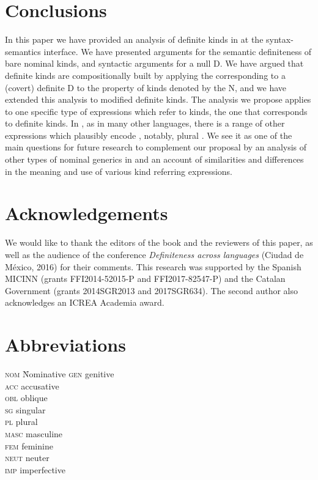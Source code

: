 \documentclass[output=paper
,modfonts
,nonflat]{langsci/langscibook}
\begin{document}
	\section{Conclusions}\label{sec:borik:4}
	
	In this paper we have provided an analysis of definite kinds in  at the syntax-semantics interface. We have presented arguments for the semantic definiteness of bare nominal kinds, and syntactic arguments for a null D. We have argued that definite kinds are compositionally built by applying the  corresponding to a (covert) definite D to the property of kinds denoted by the N, and we have extended this analysis to modified definite kinds. The analysis we propose applies to one specific type of expressions which refer to kinds, the one that corresponds to  definite kinds. In , as in many other languages, there is a range of other expressions which plausibly encode , notably, plural . We see it as one of the main questions for future research to complement our proposal by an analysis of other types of nominal generics in  and an account of similarities and differences in the meaning and use of various kind referring expressions.
	
		
	\section*{Acknowledgements}
	
	We would like to thank the editors of the book and the reviewers of this paper, as well as the audience of the conference \textit{Definiteness across languages} (Ciudad de M\'exico, 2016) for their comments. This research was supported by the Spanish MICINN (grants FFI2014-52015-P and FFI2017-82547-P) and the Catalan Government (grants 2014SGR2013 and 2017SGR634). The second author also acknowledges an ICREA Academia award.
	
	\section*{Abbreviations}
	\begin{multicols}{2}
		\begin{tabbing}
			\textsc{nom}\hspace{1em} \=  Nominative \kill 
			\textsc{gen} \>	genitive \\
			\textsc{acc} \>	accusative \\
			\textsc{obl} \>	oblique \\
			\textsc{sg} \>	singular \\
			\textsc{pl} \>	plural \\
			\textsc{masc} \> masculine \\
			\textsc{fem} \>	feminine \\ %
			\textsc{neut} \> neuter \\
			\textsc{imp} \>	imperfective \\
		\end{tabbing}
	\end{multicols}
	
	{\sloppy
		\printbibliography[heading=subbibliography,notkeyword=this]
	}
\end{document}
